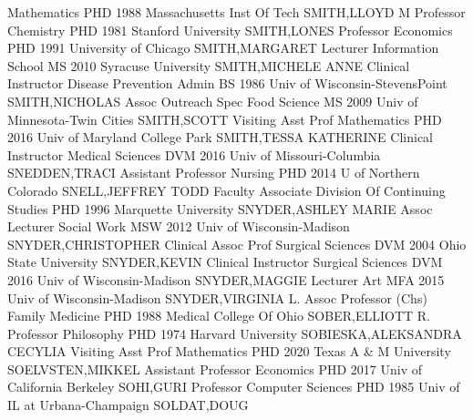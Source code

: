 \documentclass[
]{article}
\begin{document}
\textbar Mathematics \textbar PHD 1988 Massachusetts Inst Of Tech
\textbar{}  \textbar SMITH,LLOYD M \textbar Professor
\textbar Chemistry \textbar PHD 1981 Stanford University \textbar{}
 \textbar SMITH,LONES \textbar Professor \textbar Economics
\textbar PHD 1991 University of Chicago \textbar{} 
\textbar SMITH,MARGARET \textbar Lecturer \textbar Information School
\textbar MS 2010 Syracuse University \textbar{} 
\textbar SMITH,MICHELE ANNE \textbar Clinical Instructor
\textbar Disease Prevention Admin \textbar BS 1986 Univ of
Wisconsin-StevensPoint \textbar{}  \textbar SMITH,NICHOLAS
\textbar Assoc Outreach Spec \textbar Food Science \textbar MS 2009 Univ
of Minnesota-Twin Cities \textbar{}  \textbar SMITH,SCOTT
\textbar Visiting Asst Prof \textbar Mathematics \textbar PHD 2016 Univ
of Maryland College Park \textbar{}  \textbar SMITH,TESSA
KATHERINE \textbar Clinical Instructor \textbar Medical Sciences
\textbar DVM 2016 Univ of Missouri-Columbia \textbar{} 
\textbar SNEDDEN,TRACI \textbar Assistant Professor \textbar Nursing
\textbar PHD 2014 U of Northern Colorado \textbar{} 
\textbar SNELL,JEFFREY TODD \textbar Faculty Associate \textbar Division
Of Continuing Studies \textbar PHD 1996 Marquette University \textbar{}
 \textbar SNYDER,ASHLEY MARIE \textbar Assoc Lecturer
\textbar Social Work \textbar MSW 2012 Univ of Wisconsin-Madison
\textbar{}  \textbar SNYDER,CHRISTOPHER \textbar Clinical
Assoc Prof \textbar Surgical Sciences \textbar DVM 2004 Ohio State
University \textbar{}  \textbar SNYDER,KEVIN
\textbar Clinical Instructor \textbar Surgical Sciences \textbar DVM
2016 Univ of Wisconsin-Madison \textbar{} 
\textbar SNYDER,MAGGIE \textbar Lecturer \textbar Art \textbar MFA 2015
Univ of Wisconsin-Madison \textbar{} 
\textbar SNYDER,VIRGINIA L. \textbar Assoc Professor (Chs)
\textbar Family Medicine \textbar PHD 1988 Medical College Of Ohio
\textbar{}  \textbar SOBER,ELLIOTT R. \textbar Professor
\textbar Philosophy \textbar PHD 1974 Harvard University \textbar{}
 \textbar SOBIESKA,ALEKSANDRA CECYLIA \textbar Visiting Asst
Prof \textbar Mathematics \textbar PHD 2020 Texas A \& M University
\textbar{}  \textbar SOELVSTEN,MIKKEL \textbar Assistant
Professor \textbar Economics \textbar PHD 2017 Univ of California
Berkeley \textbar{}  \textbar SOHI,GURI \textbar Professor
\textbar Computer Sciences \textbar PHD 1985 Univ of IL at
Urbana-Champaign \textbar{}  \textbar SOLDAT,DOUG
\end{document}
